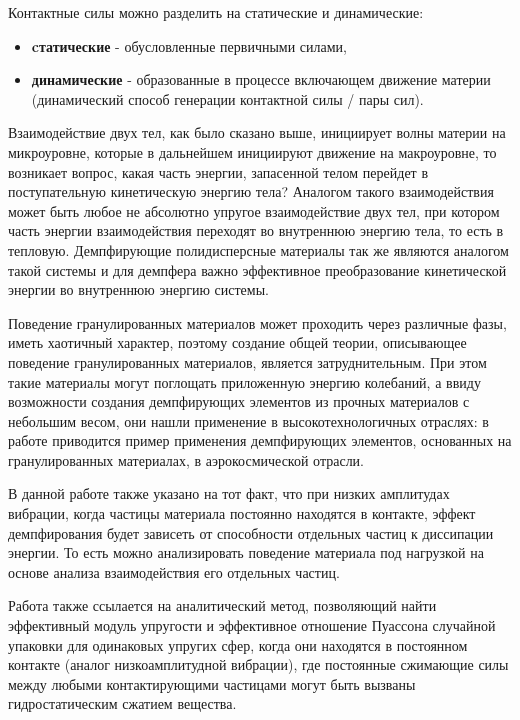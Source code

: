 Контактные силы можно разделить на статические и динамические:
\begin{itemize}
\item \textbf{cтатические} - обусловленные первичными силами,
\item \textbf{динамические} - образованные в процессе включающем движение материи (динамический способ
генерации контактной силы / пары сил).
\end{itemize}

Взаимодействие двух тел, как было сказано выше, инициирует волны материи на микроуровне, 
которые в дальнейшем инициируют движение на макроуровне, то возникает вопрос, какая часть энергии, запасенной телом перейдет в 
поступательную кинетическую энергию тела? Аналогом такого взаимодействия может быть любое не абсолютно упругое взаимодействие 
двух тел, при котором часть энергии взаимодействия переходят во внутреннюю энергию тела, 
то есть в тепловую. Демпфирующие полидисперсные материалы так же являются аналогом такой системы и для демпфера важно 
эффективное преобразование кинетической энергии во внутреннюю энергию системы\cite{InfluenceOfNodes}.

Поведение гранулированных материалов может проходить через различные фазы, иметь
хаотичный характер, поэтому создание общей теории, описывающее поведение
гранулированных материалов, является затруднительным. При этом такие материалы могут поглощать
приложенную энергию колебаний, а ввиду возможности создания демпфирующих
элементов из прочных материалов с небольшим весом, они нашли применение в
высокотехнологичных отраслях: в работе \cite{work1} приводится пример применения
демпфирующих элементов, основанных на гранулированных материалах, в
аэрокосмической отрасли.

В данной работе также указано на тот факт, что при низких амплитудах вибрации, когда
частицы материала постоянно находятся в контакте, эффект демпфирования будет зависеть
от способности отдельных частиц к диссипации энергии. То есть можно анализировать
поведение материала под нагрузкой на основе анализа взаимодействия его отдельных
частиц.

Работа \cite{work1} также ссылается на аналитический метод, позволяющий найти эффективный
модуль упругости и эффективное отношение Пуассона случайной упаковки для одинаковых
упругих сфер, когда они находятся в постоянном контакте (аналог низкоамплитудной
вибрации), где постоянные сжимающие силы между любыми контактирующими
частицами могут быть вызваны гидростатическим сжатием вещества.

